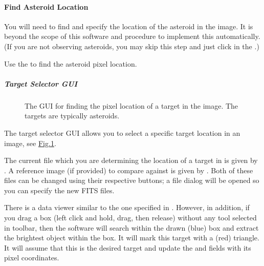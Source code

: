 \documentclass[letterpaper,11pt,english]{sphinxmanual}
\begin{document}
\paragraph{Find Asteroid Location}
\label{\detokenize{user/manual_mode:find-asteroid-location}}\label{\detokenize{user/manual_mode:user-manual-mode-procedure-find-asteroid-location}}
\sphinxAtStartPar
You will need to find and specify the location of the asteroid in the image.
It is beyond the scope of this software and procedure to implement this
automatically. (If you are not observing asteroids, you may skip this step
and just click  in the
{\hyperref[\detokenize{user/manual_mode:user-manual-mode-procedure-find-asteroid-location-target-selector-gui}]{}}.)

\sphinxAtStartPar
Use the {\hyperref[\detokenize{user/manual_mode:user-manual-mode-procedure-find-asteroid-location-target-selector-gui}]{}}
to find the asteroid pixel location.


\subparagraph{Target Selector GUI}
\label{\detokenize{user/manual_mode:target-selector-gui}}\label{\detokenize{user/manual_mode:user-manual-mode-procedure-find-asteroid-location-target-selector-gui}}
\begin{figure}[htbp]
\centering
\capstart

\noindent{}
\caption{The GUI for finding the pixel location of a target in the image. The
targets are typically asteroids.}\label{\detokenize{user/manual_mode:id4}}\label{\detokenize{user/manual_mode:figure-target-selector-gui}}\end{figure}

\sphinxAtStartPar
The target selector GUI allows you to select a specific target location in
an image, see \hyperref[\detokenize{user/manual_mode:figure-target-selector-gui}]{Fig.\@ \ref{\detokenize{user/manual_mode:figure-target-selector-gui}}}.

\sphinxAtStartPar
The current file which you are determining the location of a target in is
given by . A reference image (if provided) to compare against is
given by . Both of these files can be changed using their
respective  buttons; a file dialog will be opened so you can specify
the new FITS files.

\sphinxAtStartPar
There is a data viewer similar to the one specified in
{\hyperref[\detokenize{user/manual_mode:user-manual-mode-graphical-user-interface}]{}}. However, in addition, if you
drag a box (left click and hold, drag, then release) without any tool selected
in toolbar, then the software will search within the drawn (blue) box and
extract the brightest object within the box. It will mark this target with a
(red) triangle. It will assume that this is the desired target and update the
 and  fields with its pixel coordinates.
\end{document}
